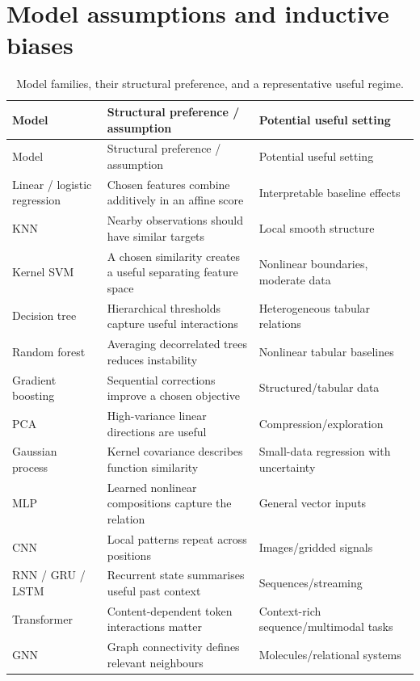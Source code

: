 \section{Model assumptions and inductive biases}
\label{sec:models-model-assumptions-and-inductive-biases}
\small
\begin{longtable}{@{}L{.22\linewidth}L{.44\linewidth}L{.25\linewidth}@{}}
\caption{Model families, their structural preference, and a representative useful regime.}\label{tab:model_biases}\\
\toprule
Model & Structural preference / assumption & Potential useful setting \\
\midrule
\endfirsthead
\toprule
Model & Structural preference / assumption & Potential useful setting \\
\midrule
\endhead
Linear / logistic regression & Chosen features combine additively in an affine score & Interpretable baseline effects \\
KNN & Nearby observations should have similar targets & Local smooth structure \\
Kernel SVM & A chosen similarity creates a useful separating feature space & Nonlinear boundaries, moderate data \\
Decision tree & Hierarchical thresholds capture useful interactions & Heterogeneous tabular relations \\
Random forest & Averaging decorrelated trees reduces instability & Nonlinear tabular baselines \\
Gradient boosting & Sequential corrections improve a chosen objective & Structured/tabular data \\
PCA & High-variance linear directions are useful & Compression/exploration \\
Gaussian process & Kernel covariance describes function similarity & Small-data regression with uncertainty \\
MLP & Learned nonlinear compositions capture the relation & General vector inputs \\
CNN & Local patterns repeat across positions & Images/gridded signals \\
RNN / GRU / LSTM & Recurrent state summarises useful past context & Sequences/streaming \\
Transformer & Content-dependent token interactions matter & Context-rich sequence/multimodal tasks \\
GNN & Graph connectivity defines relevant neighbours & Molecules/relational systems \\

\end{longtable}

